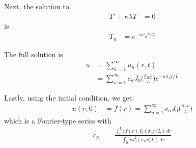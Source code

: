 Next, the solution to 
%
\begin{align*}
T' + \kappa \lambda T & = 0 
\end{align*}
is
\begin{align*}
T_n & = e^{-\kappa \sigma_n t/L} 
\end{align*}

The full solution is 
%
\begin{align*}
u & = \sum_{n=1}^{\infty} u_n(r,t) \\
& = \sum_{n=1}^{\infty} c_n J_0\biggl(\frac{\sigma_n x}{L} \biggr) e^{-\kappa \sigma_n t/L} 
\end{align*}

Lastly, using the initial condition, we get:
%
\begin{align*}
u(r,0) & = f(r) =\sum_{n=1}^{\infty} c_n J_0\biggl(\frac{\sigma_n r}{L} \biggr) 
\end{align*}
which is a Fourier-type series with 
%
\begin{align*}
c_n & = \frac{\int_0^L r f(r) J_0(\sigma_n r/L) \, dr}{\int_0^{L} r J_0^2(\sigma_n r/L) \, dr} 
\end{align*}

